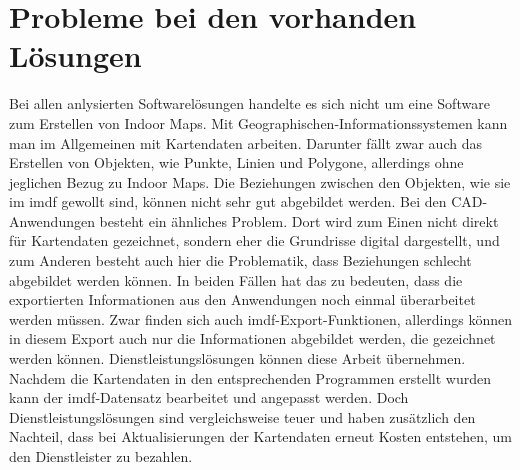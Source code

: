 \section{Probleme bei den vorhanden Lösungen}
Bei allen anlysierten Softwarelösungen handelte es sich nicht um eine Software zum Erstellen von Indoor Maps.
Mit Geographischen-Informationssystemen kann man im Allgemeinen mit Kartendaten arbeiten.
Darunter fällt zwar auch das Erstellen von Objekten, wie Punkte, Linien und Polygone, allerdings ohne jeglichen Bezug zu Indoor Maps.
Die Beziehungen zwischen den Objekten, wie sie im \acl{imdf} gewollt sind, können nicht sehr gut abgebildet werden.
Bei den CAD-Anwendungen besteht ein ähnliches Problem.
Dort wird zum Einen nicht direkt für Kartendaten gezeichnet, sondern eher die Grundrisse digital dargestellt, und zum Anderen besteht auch hier die Problematik, dass Beziehungen schlecht abgebildet werden können.\pbreak%
%
In beiden Fällen hat das zu bedeuten, dass die exportierten Informationen aus den Anwendungen noch einmal überarbeitet werden müssen.
Zwar finden sich auch \ac{imdf}-Export-Funktionen, allerdings können in diesem Export auch nur die Informationen abgebildet werden, die gezeichnet werden können.\pbreak%
%
Dienstleistungslösungen können diese Arbeit übernehmen.
Nachdem die Kartendaten in den entsprechenden Programmen erstellt wurden kann der \ac{imdf}-Datensatz bearbeitet und angepasst werden.
Doch Dienstleistungslösungen sind vergleichsweise teuer und haben zusätzlich den Nachteil, dass bei Aktualisierungen der Kartendaten erneut Kosten entstehen, um den Dienstleister zu bezahlen.
